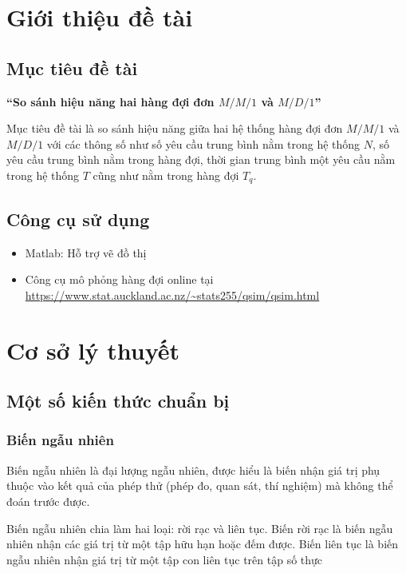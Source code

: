 \documentclass[a4paper]{article}
\begin{document}
\thispagestyle{empty}
\tableofcontents
\cleardoublepage

\par \noindent

\section{Giới thiệu đề tài}
\subsection{Mục tiêu đề tài}
\textbf{“So sánh hiệu năng hai hàng đợi đơn $M/M/1$ và $M/D/1$”}
\par \noindent
Mục tiêu đề tài là so sánh hiệu năng giữa hai hệ thống hàng đợi đơn $M/M/1$ và $M/D/1$ với các thông số như số yêu cầu trung bình nằm trong hệ thống $N$, số yêu cầu trung bình nằm trong hàng đợi, thời gian trung bình một yêu cầu nằm trong hệ thống $T$ cũng như nằm trong hàng đợi $T_q$.
\subsection{Công cụ sử dụng}
\begin{itemize}
\item Matlab: Hỗ trợ vẽ đồ thị
\item Công cụ mô phỏng hàng đợi online tại \url{https://www.stat.auckland.ac.nz/~stats255/qsim/qsim.html}
\end{itemize}
\section{Cơ sở lý thuyết}
\subsection{Một số kiến thức chuẩn bị}
\subsubsection{Biến ngẫu nhiên}
Biến ngẫu nhiên là đại lượng ngẫu nhiên, được hiểu là biến nhận giá trị phụ thuộc vào kết quả của phép thử (phép đo, quan sát, thí nghiệm) mà không thể đoán trước được.
\par \noindent
Biến ngẫu nhiên chia làm hai loại: rời rạc và liên tục. Biến rời rạc là biến ngẫu nhiên nhận các giá trị từ một tập hữu hạn hoặc đếm được. Biến liên tục là biến ngẫu nhiên nhận giá trị từ một tập con liên tục trên tập số thực
\end{document}
